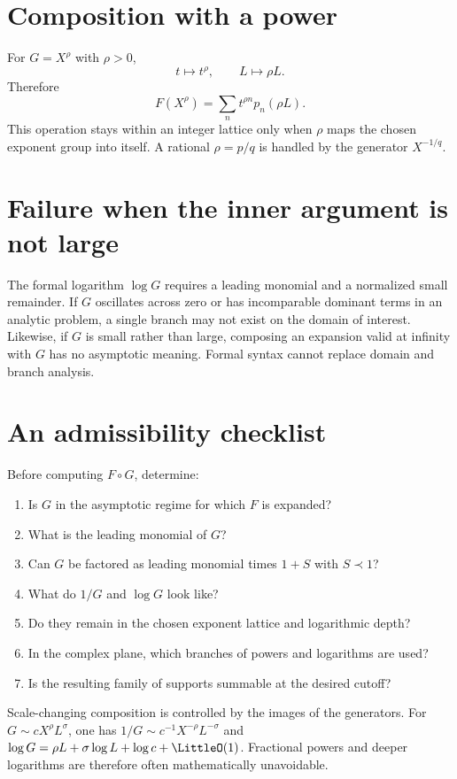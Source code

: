 \documentclass[11pt,oneside]{book}
\theoremstyle{definition}
\theoremstyle{remark}
\newcommand{\precdom}{\prec}
\newcommand{\compose}{\mathbin{\circ}}
\begin{document}
\section{Composition with a power}
For $G=X^\rho$ with $\rho>0$,
\[
 t\mapsto t^\rho,
 \qquad
 L\mapsto\rho L.
\]
Therefore
\begin{equation}\label{eq:composition-power}
 F(X^\rho)=\sum_n t^{\rho n}p_n(\rho L).
\end{equation}
This operation stays within an integer lattice only when $\rho$ maps the
chosen exponent group into itself.  A rational $\rho=p/q$ is handled by the
generator $X^{-1/q}$.

\section{Failure when the inner argument is not large}
The formal logarithm $\log G$ requires a leading monomial and a normalized
small remainder.  If $G$ oscillates across zero or has incomparable dominant
terms in an analytic problem, a single branch may not exist on the domain of
interest.  Likewise, if $G$ is small rather than large, composing an expansion
valid at infinity with $G$ has no asymptotic meaning.  Formal syntax cannot
replace domain and branch analysis.

\section{An admissibility checklist}
Before computing $F\compose G$, determine:
\begin{enumerate}
\item Is $G$ in the asymptotic regime for which $F$ is expanded?
\item What is the leading monomial of $G$?
\item Can $G$ be factored as leading monomial times $1+S$ with $S\precdom1$?
\item What do $1/G$ and $\log G$ look like?
\item Do they remain in the chosen exponent lattice and logarithmic depth?
\item In the complex plane, which branches of powers and logarithms are used?
\item Is the resulting family of supports summable at the desired cutoff?
\end{enumerate}

\begin{summarybox}
Scale-changing composition is controlled by the images of the generators.
For $G\sim cX^\rho L^\sigma$, one has
$1/G\sim c^{-1}X^{-\rho}L^{-\sigma}$ and
$\log G=\rho L+\sigma\log L+\log c+\LittleO(1)$.  Fractional powers and deeper
logarithms are therefore often mathematically unavoidable.
\end{summarybox}
\end{document}
